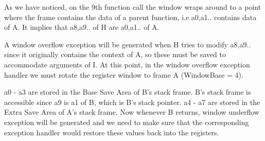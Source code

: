 As we have noticed, on the 9th function call the window wraps around to a point where the frame contains the data of a parent function, i.e a0,a1.. contains data of A. It implies that a8,a9.. of H are a0,a1.. of A.

A window overflow exception will be generated when H tries to modify a8,a9.. since it originally contains the context of A, so these must be saved to accommodate arguments of I. At this point, in the window overflow exception handler we must rotate the register window to frame A (WindowBase = 4).

a0 - a3 are stored in the Base Save Area of B’s stack frame. B’s stack frame is accessible since a9 is a1 of B, which is B’s stack pointer.
a4 - a7 are stored in the Extra Save Area of A’s stack frame.
Now whenever B returns, window underflow exception will be generated and we need to make sure that the corresponding exception handler would restore these values back into the registers.

